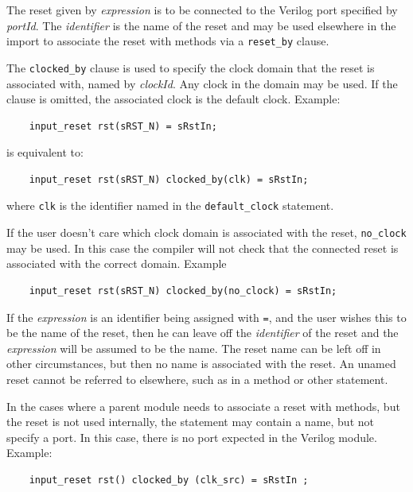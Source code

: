 \documentclass[twoside,letterpaper]{article}
\newcommand{\te}[1]{\texttt{#1}}
\newcommand{\nterm}[1]{\emph{#1}}
\newcommand{\term}[1]{\texttt{#1}}
\begin{document}
The reset given by \nterm{expression} is to be
connected to the Verilog port specified by \nterm{portId}.  The
\nterm{identifier} is the name of the reset and may be used  elsewhere
in the import to
associate the  reset with methods via a \texttt{reset\_by} clause.  

The \te{clocked\_by} clause is used to specify the clock domain that the
reset is associated with, named by   \nterm{clockId}.  Any clock in
the domain may be used.  If the clause is omitted, the associated
clock is  the default clock. Example:
\begin{verbatim}
    input_reset rst(sRST_N) = sRstIn;
\end{verbatim}
is equivalent to:
\begin{verbatim}
    input_reset rst(sRST_N) clocked_by(clk) = sRstIn;
\end{verbatim}
where \te{clk} is the identifier named in the \te{default\_clock} statement.


 If the user doesn't care which clock domain is
associated with the reset, 
\te{no\_clock} may be used.  In this case the compiler will not check
that the connected reset is associated with the correct domain.  Example
\begin{verbatim}
    input_reset rst(sRST_N) clocked_by(no_clock) = sRstIn;
\end{verbatim}

If the \nterm{expression} is an identifier being assigned with
\term{=}, and the user wishes this to be the name of the reset, then
he can leave off the \nterm{identifier} of the reset and the \nterm{expression}
will be assumed to be the name.  The reset name can be left off in
other circumstances, but then no name is associated with the reset. An
unamed reset cannot be referred to elsewhere, such as in a
method or  other statement.



In the cases where a parent module needs to associate a reset with
methods, but the reset is not used internally, the statement may
contain a name, but not specify a port. In this case, there is no port
expected in the Verilog module.  Example:
\begin{verbatim}
    input_reset rst() clocked_by (clk_src) = sRstIn ;
\end{verbatim}
\end{document}
